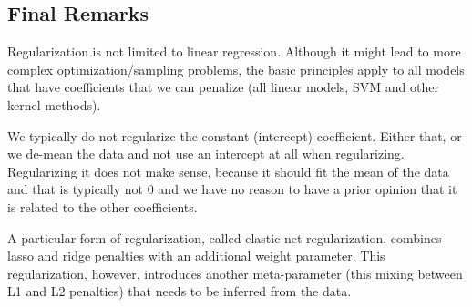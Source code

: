 \begin{refsection}
\subsection*{Final Remarks}

Regularization is not limited to linear regression. Although it might lead to more complex optimization/sampling problems, the basic principles apply to all models that have coefficients that we can penalize (all linear models, SVM and other kernel methods).

We typically do not regularize the constant (intercept) coefficient. Either that, or we de-mean the data and not use an intercept at all when regularizing. Regularizing it does not make sense, because it should fit the mean of the data and that is typically not 0 and we have no reason to have a prior opinion that it is related to the other coefficients.

A particular form of regularization, called elastic net regularization, combines lasso and ridge penalties with an additional weight parameter. This regularization, however, introduces another meta-parameter (this mixing between L1 and L2 penalties) that needs to be inferred from the data.


\end{refsection}

